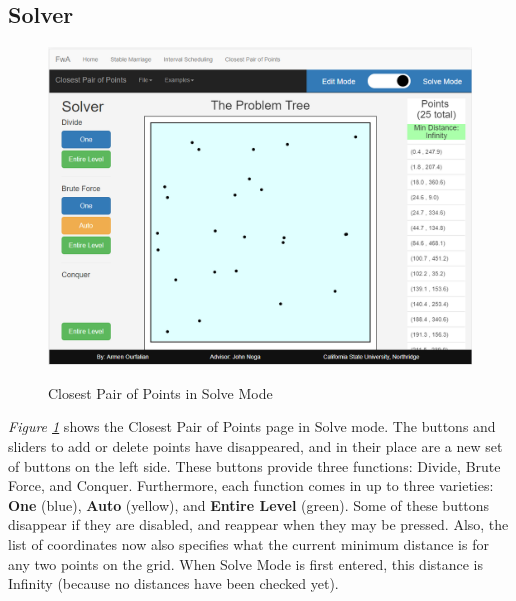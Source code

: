 \subsection{Solver}
\begin{figure}[H]
	\caption{Closest Pair of Points in Solve Mode}
	\includegraphics[width=\linewidth]
	{images/closest-pair-of-points/cpop-solver-1.png}
	\label{fig-cpop-solver-1}
	\centering
\end{figure}
\hspace{-0.3in}
\textit{Figure \ref{fig-cpop-solver-1}} shows the Closest Pair of Points page in 
Solve mode. The buttons and sliders to add or delete points have disappeared, 
and in their place are a new set of buttons on the left side. 
These buttons provide three functions: Divide, Brute Force, and Conquer.
Furthermore, each function comes in up to three varieties: 
\textbf{One} (blue), \textbf{Auto} (yellow), and \textbf{Entire Level} (green). 
Some of these buttons disappear if they are disabled, and reappear when they 
may be pressed. 
Also, the list of coordinates now also specifies what the current minimum distance
is for any two points on the grid. When Solve Mode is first entered, this 
distance is Infinity (because no distances have been checked yet).
